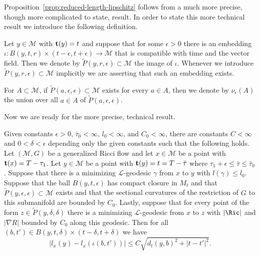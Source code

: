 Proposition~\ref{prop:reduced-length-lipschitz} follows from a much more precise, though more
complicated to state, result. In order to state this more technical
result we introduce the following definition.

\begin{definition}\label{def:l-parabolic-neighborhood}
Let $y\in {\mathcal M}$ with ${\bf t}(y)=t$ and suppose that for
some $\epsilon>0$ there is an embedding $\iota\colon B(y,t,r)\times
(t-\epsilon,t+\epsilon)\to {\mathcal M}$ that is compatible with
time and the vector field. Then we denote by $\widetilde
P(y,r,\epsilon)\subset {\mathcal M}$ the image of $\iota$. Whenever
we introduce $\widetilde P(y,r,\epsilon)\subset {\mathcal M}$
implicitly we are asserting that such an embedding exists.

For  $A\subset {\mathcal M}$, if $\widetilde
P(a,\epsilon,\epsilon)\subset {\mathcal M}$ exists for every $a\in
A$, then we denote by $\nu_\epsilon(A)$ the union over all $a\in A$
of $\widetilde P(a,\epsilon,\epsilon)$.
\end{definition}


Now we are ready for the more precise, technical result.


\begin{proposition}\label{prop:reduced-length-lipschitz-precise}
\label{lipaty}
Given constants  $\epsilon>0$, $\bar\tau_0<\infty$, $l_0<\infty$,
and $C_0<\infty$, there are constants $ C<\infty$ and
$0<\delta<\epsilon$ depending only the  given constants  such that
the following holds. Let $({\mathcal M},G)$ be a generalized Ricci
flow and let $x\in{\mathcal M}$ be a point with ${\bf
t}(x)=T-\tau_1$. Let $y\in {\mathcal M}$ be a point with ${\bf
t}(y)=t=T-\bar\tau$ where $\tau_1+\epsilon\le \bar\tau\le
\bar\tau_0$. Suppose that there is a minimizing ${\mathcal
L}$-geodesic $\gamma$ from $x$ to $y$ with $l(\gamma)\le l_0$.
Suppose that the ball $B(y,t,\epsilon)$ has compact closure in
$M_{t}$ and that $\widetilde P(y,\epsilon,\epsilon)\subset {\mathcal
M}$ exists and that the sectional curvatures of the restriction of
$G$ to this submanifold are bounded by $C_0$. Lastly, suppose that
for every point of the form $z\in \widetilde P(y,\delta,\delta)$
there is a minimizing ${\mathcal L}$-geodesic from $x$ to $z$ with
$|\Ric|$ and $|\nabla R|$ bounded by $C_0$ along this geodesic.
Then for all $(b,t')\in B(y,t,\delta)\times(t-\delta,t+\delta)$ we
have
$$|l_x(y)-l_x(\iota(b,t'))|\le C\sqrt{d_{t}(y,b)^2+|t-t'|^2}.$$
\end{proposition}




